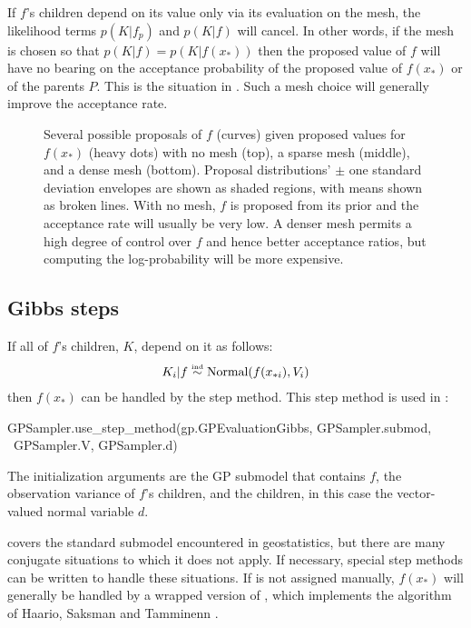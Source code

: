 \documentclass[article]{jss}
\begin{document}
If $f$'s children depend on its value only via its evaluation on the mesh, the likelihood terms $p(K|f_p)$ and $p(K|f)$ will cancel. In other words, if the mesh is chosen so that $p(K|f)=p(K|f(x_*))$ then the proposed value of $f$ will have no bearing on the acceptance probability of the proposed value of $f(x_*)$ or of the parents $P$. This is the situation in . Such a mesh choice will generally improve the acceptance rate.

\begin{figure}
    \centering
    \caption{Several possible proposals of $f$ (curves) given proposed values for $f(x_*)$ (heavy dots) with no mesh (top), a sparse mesh (middle), and a dense mesh (bottom). Proposal distributions'  $\pm$ one standard deviation envelopes are shown as shaded regions, with means shown as broken lines. With no mesh, $f$ is proposed from its prior and the acceptance rate will usually be very low. A denser mesh permits a high degree of control over $f$ and hence better acceptance ratios, but computing the log-probability will be more expensive.}
    \label{fig:meshpropose}
\end{figure}

\subsection{Gibbs steps} 
If all of $f$'s children, $K$, depend on it as follows:
\begin{eqnarray*}
    K_i|f \stackrel{\textup{\tiny ind}}{\sim} \textup{Normal}(f(x_{*i}),V_i)
\end{eqnarray*}
then $f(x_*)$ can be handled by the  step method. This step method is used in :
\begin{CodeChunk}
\begin{CodeInput}
GPSampler.use_step_method(gp.GPEvaluationGibbs, GPSampler.submod, \
    GPSampler.V, GPSampler.d)
\end{CodeInput}
\end{CodeChunk}
The initialization arguments are the GP submodel that contains $f$, the observation variance of $f$'s children, and the children, in this case the vector-valued normal variable $d$. 

 covers the standard submodel encountered in geostatistics, but there are many conjugate situations to which it does not apply. If necessary, special step methods can be written to handle these situations. If  is not assigned manually, $f(x_*)$ will generally be handled by a wrapped version of  \citep{pymc}, which implements the algorithm of Haario, Saksman and Tamminenn \citep{haario}.
\end{document}
